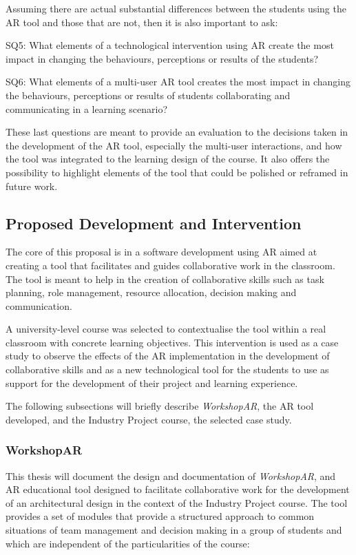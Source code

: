Assuming there are actual substantial differences between the students using the \ac{AR} tool and those that are not, then it is also important to ask:

\begin{displayquote}
    SQ5: What elements of a technological intervention using \ac{AR} create the most impact in changing the behaviours, perceptions or results of the students? 
\end{displayquote}

\begin{displayquote}
    SQ6: What elements of a multi-user \ac{AR} tool creates the most impact in changing the behaviours, perceptions or results of students collaborating and communicating in a
    learning scenario? 
\end{displayquote}

These last questions are meant to provide an evaluation to the decisions taken in the development of the \ac{AR} tool, especially the multi-user interactions, and how the tool was
integrated to the learning design of the course. It also offers the possibility to highlight elements of the tool that could be polished or reframed in future work.

\subsection{Proposed Development and Intervention \label{sec:1-2-2}}
The core of this proposal is in a software development using \ac{AR} aimed at creating a tool that facilitates and guides collaborative work in the classroom. The tool is meant to
help in the creation of collaborative skills such as task planning, role management, resource allocation, decision making and communication.

A university-level course was selected to contextualise the tool within a real classroom with concrete learning objectives. This intervention is used as a case study to observe the
effects of the \ac{AR} implementation in the development of collaborative skills and as a new technological tool for the students to use as support for the development of their
project and learning experience.

The following subsections will briefly describe \emph{WorkshopAR}, the \ac{AR} tool developed, and the Industry Project course, the selected case study.

\subsubsection{WorkshopAR \label{sec:1-2-2-1}}
This thesis will document the design and documentation of \emph{WorkshopAR}, and \ac{AR} educational tool designed to facilitate collaborative work for the development of an
architectural design in the context of the Industry Project course. The tool provides a set of modules that provide a structured approach to common situations of team management and
decision making in a group of students and which are independent of the particularities of the course:

